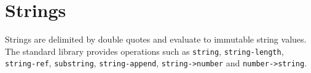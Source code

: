 \section{Strings}

Strings are delimited by double quotes and evaluate to immutable string values.
The standard library provides operations such as \texttt{string},
\texttt{string-length}, \texttt{string-ref}, \texttt{substring},
\texttt{string-append}, \texttt{string->number} and \texttt{number->string}.

